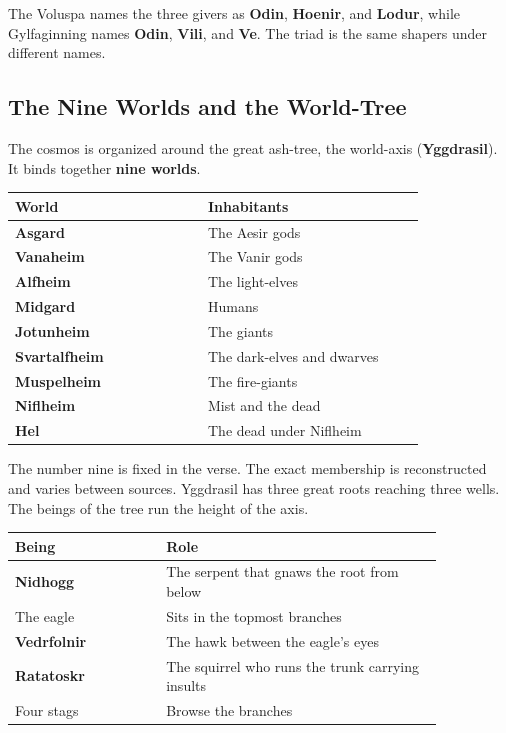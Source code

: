The Voluspa names the three givers as \textbf{Odin}, \textbf{Hoenir}, and \textbf{Lodur}, while Gylfaginning names \textbf{Odin}, \textbf{Vili}, and \textbf{Ve}. The triad is the same shapers under different names.

\subsection{The Nine Worlds and the World-Tree}

The cosmos is organized around the great ash-tree, the world-axis (\textbf{Yggdrasil}). It binds together \textbf{nine worlds}.

\begin{longtable}{L{0.4\linewidth}
L{0.45\linewidth}}
\toprule
\textbf{World} & \textbf{Inhabitants} \\
\midrule
\textbf{Asgard} & The Aesir gods \\
\textbf{Vanaheim} & The Vanir gods \\
\textbf{Alfheim} & The light-elves \\
\textbf{Midgard} & Humans \\
\textbf{Jotunheim} & The giants \\
\textbf{Svartalfheim} & The dark-elves and dwarves \\
\textbf{Muspelheim} & The fire-giants \\
\textbf{Niflheim} & Mist and the dead \\
\textbf{Hel} & The dead under Niflheim \\
\bottomrule
\end{longtable}

The number nine is fixed in the verse. The exact membership is reconstructed and varies between sources. Yggdrasil has three great roots reaching three wells. The beings of the tree run the height of the axis.

\begin{longtable}{L{0.3\linewidth}
L{0.55\linewidth}}
\toprule
\textbf{Being} & \textbf{Role} \\
\midrule
\textbf{Nidhogg} & The serpent that gnaws the root from below \\
The eagle & Sits in the topmost branches \\
\textbf{Vedrfolnir} & The hawk between the eagle's eyes \\
\textbf{Ratatoskr} & The squirrel who runs the trunk carrying insults \\
Four stags & Browse the branches \\
\bottomrule
\end{longtable}

